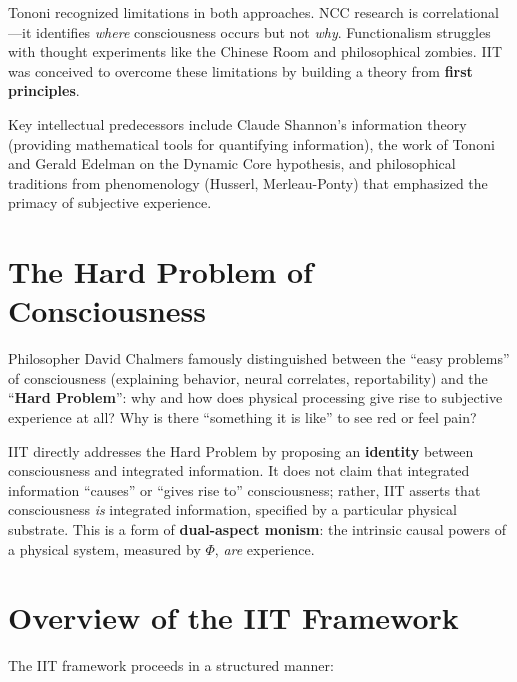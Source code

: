 \documentclass[11pt,a4paper]{report}
\newcommand{\Phi}{\varPhi}
\begin{document}
Tononi recognized limitations in both approaches. NCC research is correlational---it identifies \emph{where} consciousness occurs but not \emph{why}. Functionalism struggles with thought experiments like the Chinese Room and philosophical zombies. IIT was conceived to overcome these limitations by building a theory from \textbf{first principles}.

Key intellectual predecessors include Claude Shannon's information theory (providing mathematical tools for quantifying information), the work of Tononi and Gerald Edelman on the Dynamic Core hypothesis, and philosophical traditions from phenomenology (Husserl, Merleau-Ponty) that emphasized the primacy of subjective experience.

\section{The Hard Problem of Consciousness}

Philosopher David Chalmers famously distinguished between the ``easy problems'' of consciousness (explaining behavior, neural correlates, reportability) and the ``\textbf{Hard Problem}'': why and how does physical processing give rise to subjective experience at all? Why is there ``something it is like'' to see red or feel pain?

IIT directly addresses the Hard Problem by proposing an \textbf{identity} between consciousness and integrated information. It does not claim that integrated information ``causes'' or ``gives rise to'' consciousness; rather, IIT asserts that consciousness \emph{is} integrated information, specified by a particular physical substrate. This is a form of \textbf{dual-aspect monism}: the intrinsic causal powers of a physical system, measured by $\Phi$, \emph{are} experience.

\section{Overview of the IIT Framework}

The IIT framework proceeds in a structured manner:
\end{document}
